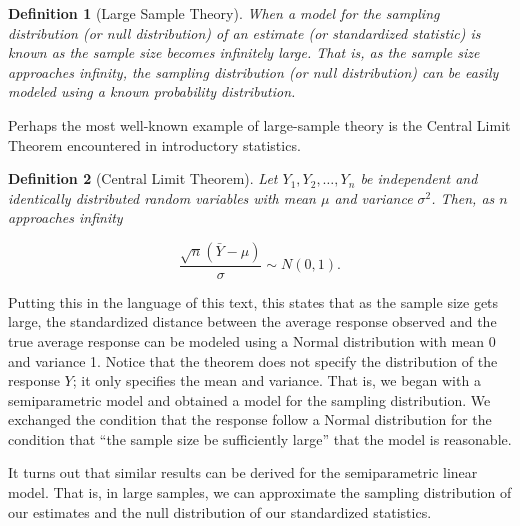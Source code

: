 \documentclass[
]{book}
\theoremstyle{plain}
\theoremstyle{mydefn}
\newtheorem{definition}{Definition}[chapter]
\theoremstyle{myexmpl}
\theoremstyle{remark}
\begin{document}
\begin{definition}[Large Sample Theory]
\protect\hypertarget{def:defn-large-sample-theory}{}{\label{def:defn-large-sample-theory} {} }When a model for the sampling distribution (or null distribution) of an estimate (or standardized statistic) is known as the sample size becomes infinitely large. That is, as the sample size approaches infinity, the sampling distribution (or null distribution) can be easily modeled using a known probability distribution.
\end{definition}

Perhaps the most well-known example of large-sample theory is the Central Limit Theorem encountered in introductory statistics.

\begin{definition}[Central Limit Theorem]
\protect\hypertarget{def:defn-clt}{}{\label{def:defn-clt} {} }Let \(Y_1, Y_2, \dotsc, Y_n\) be independent and identically distributed random variables with mean \(\mu\) and variance \(\sigma^2\). Then, as \(n\) approaches infinity

\[\frac{\sqrt{n}\left(\bar{Y} - \mu\right)}{\sigma} \sim N(0, 1).\]
\end{definition}

Putting this in the language of this text, this states that as the sample size gets large, the standardized distance between the average response observed and the true average response can be modeled using a Normal distribution with mean 0 and variance 1. Notice that the theorem does not specify the distribution of the response \(Y\); it only specifies the mean and variance. That is, we began with a semiparametric model and obtained a model for the sampling distribution. We exchanged the condition that the response follow a Normal distribution for the condition that ``the sample size be sufficiently large'' that the model is reasonable.

It turns out that similar results can be derived for the semiparametric linear model. That is, in large samples, we can approximate the sampling distribution of our estimates and the null distribution of our standardized statistics.
\end{document}
